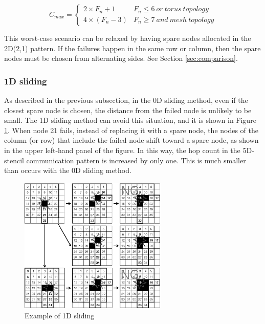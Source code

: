 \documentclass[Afour,times,sagev]{sagej}
\begin{document}
\begin{equation}
C_{max} = \left \{ \begin{array}{ll}
2 \times F_n + 1 & F_n \leq 6~or~torus~topology \\
4 \times ( F_n - 3 ) & F_n \geq 7~and~mesh~topology
\end{array}\nonumber
\right.
\end{equation}

This worst-case scenario can be relaxed by having spare nodes
allocated in the 2D(2,1) pattern. If the failures happen in the same
row or column, then the spare nodes must be chosen from alternating
sides. See Section \ref{sec:comparison}.


\subsubsection{1D sliding}

As described in the previous subsection, in the 0D sliding method,
even if the closest spare node is chosen, the distance from the failed
node is unlikely to be small. The 1D sliding method can avoid this
situation, and it is shown in Figure \ref{fig:1d-sliding}. When node
21 fails, instead of replacing it with a spare node, the nodes of the
column (or row) that include the failed node shift toward a
spare node, as shown in the upper left-hand panel of the figure. In
this way, the hop count in the 5D-stencil communication pattern is
increased by only one. This is much smaller than occurs with the 0D
sliding method.

\begin{figure}[ht]
\centering
\includegraphics[width=70mm]{Figs/1D-Sliding.eps}
  \caption{Example of 1D sliding}
  \label{fig:1d-sliding}
\end{figure}
\end{document}
